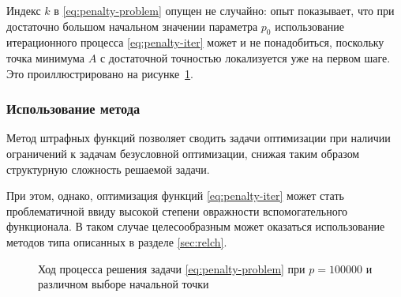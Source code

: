 Индекс $k$ в \eqref{eq:penalty-problem} опущен не случайно: опыт
показывает, что при достаточно большом начальном значении параметра
$p_0$ использование итерационного процесса \eqref{eq:penalty-iter}
может и не понадобиться, поскольку точка минимума $A$ с достаточной
точностью локализуется уже на первом шаге. Это проиллюстрировано на
рисунке \ref{fig:penalty}.

\subsubsection{Использование метода}

Метод штрафных функций позволяет сводить задачи оптимизации при
наличии ограничений к задачам безусловной оптимизации, снижая таким
образом структурную сложность решаемой задачи.

При этом, однако, оптимизация функций \eqref{eq:penalty-iter} может
стать проблематичной ввиду высокой степени овражности вспомогательного
функционала. В таком случае целесообразным может оказаться
использование методов типа описанных в разделе \ref{sec:relch}.

\begin{figure}[!thb]
  \centering
  \caption[Метод штрафных функций]{Ход процесса решения задачи
    \eqref{eq:penalty-problem} при $p=100000$ и различном выборе начальной
    точки}
  \label{fig:penalty}
\end{figure}